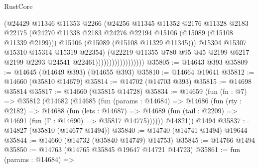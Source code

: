 \begin{lexlean}{RustCore}
\begin{coremodule}
                                      (@24429
                                        @11346
                                        @11353
                                        @2266
                                        (@24256
                                          @11345
                                          @11352
                                          @2176
                                          @11328
                                          @2183
                                          @22175
                                          (@24270
                                            @11338
                                            @2183
                                            @24276
                                            @22194
                                            @15106
                                            (@15089 (@15108 @11339 @2199)))
                                          @15106
                                          (@15089 (@15108 @11329 @11345)))
                                        @15304
                                        @15307
                                        @15310
                                        @15314
                                        @15319
                                        @22354)
                                      (@22219
                                        @11355
                                        @780
                                        @95
                                        @45
                                        @2199
                                        @6217
                                        @2199
                                        @2293
                                        @24541
                                        @22461))))))))))))))))))
@35805 := @14643 @393
@35809 := @14645 (@14649 @393) (@14655 @393)
@35810 := @14664 @19641
@35812 := @14660 (@35810 @14679)
@35814 := @14702 (@14703 @393)
@35815 := @14698 @35814
@35817 := @14660 (@35815 @14728)
@35834 := @14659
    (fun (fn : @7) =>
    @35812
      (@14682
        (@14685
          (fun (params : @14684) =>
          @14686
            (fun (rty : @2182) =>
            @14688
              (fun (lets : @14687) =>
              @14689 (fun (tail : @2209) => @14691 (fun (Γ : @14690) => @35817 @14775))))))
        @14821))
    @1494
@35837 := @14827 (@35810 (@14677 @1494))
@35840 := @14740 (@14741 @1494) @19644
@35844 := @14660 (@14732 (@35840 @14749) @14753)
@35845 := @14766 @1494
@35850 := @14763 (@14765 @35845 @19647 @14721 @14723)
@35861 := fun (params : @14684) =>

\end{coremodule}
\end{lexlean}
